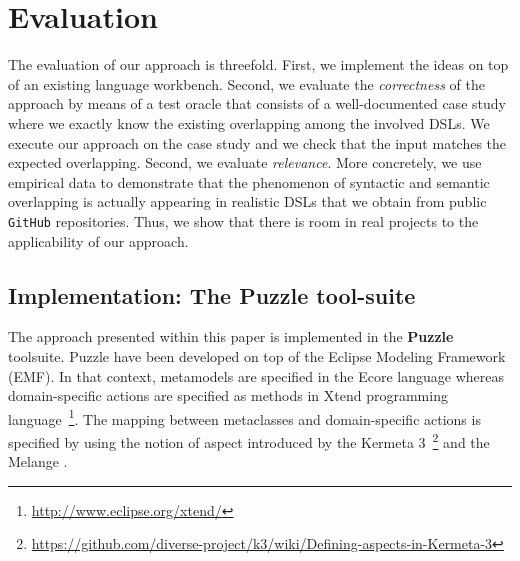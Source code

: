 \section{Evaluation}
\label{sec:validation}

The evaluation of our approach is threefold. First, we implement the ideas on top of an existing language workbench. Second, we evaluate the \textit{correctness} of the approach by means of a test oracle that consists of a well-documented case study where we exactly know the existing overlapping among the involved DSLs. We execute our approach on the case study and we check that the input matches the expected overlapping. Second, we evaluate \textit{relevance}. More concretely, we use empirical data to demonstrate that the phenomenon of syntactic and semantic overlapping is actually appearing in realistic DSLs that we obtain from public \texttt{GitHub} repositories. Thus, we show that there is room in real projects to the applicability of our approach.  

\subsection{Implementation: The Puzzle tool-suite}

The approach presented within this paper is implemented in the \textbf{Puzzle} toolsuite. Puzzle have been developed on top of the Eclipse Modeling Framework (EMF). In that context, metamodels are specified in the Ecore language whereas domain-specific actions are specified as methods in Xtend programming language~\footnote{\url{http://www.eclipse.org/xtend/}}. The mapping between metaclasses and domain-specific actions is specified by using the notion of aspect introduced by the Kermeta 3~\footnote{\url{https://github.com/diverse-project/k3/wiki/Defining-aspects-in-Kermeta-3}} and the Melange \cite{Degueule:2015}. %


